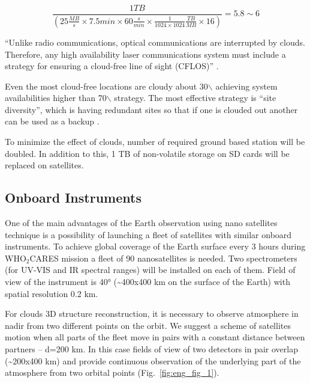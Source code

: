 \documentclass{scrartcl}
\newcommand{\whocares}{WHO$_2$CARES }
\begin{document}
\begin{equation}
\frac{1 TB}{(25 \frac{MB}{s} \times 7.5 min \times 60 \frac{s}{min} \times \frac{1}{1024\times1024}\frac{TB}{MB} \times 16)} = 5.8 \sim 6
\end{equation}

``Unlike radio communications, optical communications are interrupted by
clouds. Therefore, any high availability laser communications system
must include a strategy for ensuring a cloud-free line of sight
(CFLOS)'' \citep{link}.

Even the most cloud-free locations are cloudy about 30$\backslash$%
achieving system availabilities higher than 70$\backslash$%
strategy. The most effective strategy is ``site diversity'', which is
having redundant sites so that if one is clouded out another can be used
as a backup \citep{link}.

To minimize the effect of clouds, number of required ground based
station will be doubled. In addition to this, 1 TB of non-volatile
storage on SD cards will be replaced on satellites.

\subsection{Onboard Instruments}
\label{sec:orgac81367}

One of the main advantages of the Earth observation using nano satellites technique is a possibility of launching a fleet of satellites with similar onboard instruments. To achieve global coverage of the Earth surface every 3 hours during \whocares mission a fleet of 90 nanosatellites is needed. Two spectrometers (for UV-VIS and IR spectral ranges) will be installed on each of them. Field of view of the instrument is 40° (\textasciitilde{}400x400 km on the surface of the Earth) with spatial resolution 0.2 km. 

For clouds 3D structure reconstruction, it is necessary to observe atmosphere in nadir from two different points on the orbit. We suggest a scheme of satellites motion when all parts of the fleet move in pairs with a constant distance between partners – d=200 km. In this case fields of view of two detectors in pair overlap (\textasciitilde{}200x400 km) and provide continuous observation of the underlying part of the atmosphere from two orbital points (Fig.~\ref{fig:eng_fig_1}). 
\end{document}
